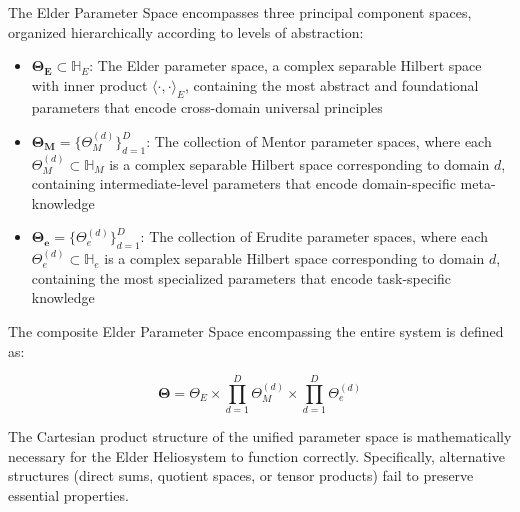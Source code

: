 \begin{definition}
\label{def:elder_parameter_space}
The Elder Parameter Space encompasses three principal component spaces, organized hierarchically according to levels of abstraction:

\begin{itemize}
    \item $\boldsymbol{\Theta_E} \subset \mathbb{H}_E$: The Elder parameter space, a complex separable Hilbert space with inner product $\langle \cdot, \cdot \rangle_E$, containing the most abstract and foundational parameters that encode cross-domain universal principles
    
    \item $\boldsymbol{\Theta_M} = \{\Theta_M^{(d)}\}_{d=1}^D$: The collection of Mentor parameter spaces, where each $\Theta_M^{(d)} \subset \mathbb{H}_M$ is a complex separable Hilbert space corresponding to domain $d$, containing intermediate-level parameters that encode domain-specific meta-knowledge
    
    \item $\boldsymbol{\Theta_e} = \{\Theta_e^{(d)}\}_{d=1}^D$: The collection of Erudite parameter spaces, where each $\Theta_e^{(d)} \subset \mathbb{H}_e$ is a complex separable Hilbert space corresponding to domain $d$, containing the most specialized parameters that encode task-specific knowledge
\end{itemize}

The composite Elder Parameter Space encompassing the entire system is defined as:

\begin{equation}
\boldsymbol{\Theta} = \Theta_E \times \prod_{d=1}^D \Theta_M^{(d)} \times \prod_{d=1}^D \Theta_e^{(d)}
\end{equation}
\end{definition}



\begin{theorem}
\label{thm:cartesian_product_necessity}
The Cartesian product structure of the unified parameter space is mathematically necessary for the Elder Heliosystem to function correctly. Specifically, alternative structures (direct sums, quotient spaces, or tensor products) fail to preserve essential properties.
\end{theorem}

